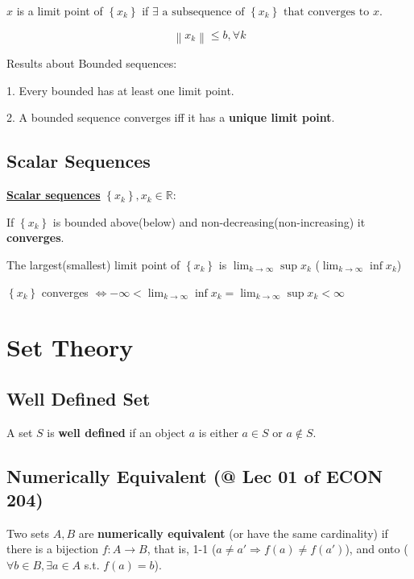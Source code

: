 \documentclass[11pt]{elegantbook}
\begin{document}
\begin{definition}
$x$ is a limit point of $\left\{x_{k}\right\}$ if $\exists \text { a subsequence of }\left\{x_{k}\right\} \text { that converges to } x$.
\end{definition}

\begin{definition}
    $$\left\|x_{k}\right\| \leqslant b, \forall k$$
\end{definition}

Results about Bounded sequences:

1. Every bounded has at least one limit point.

2. A bounded sequence converges iff it has a \textbf{unique limit point}.

\subsection{Scalar Sequences}
\textbf{\underline{Scalar sequences}} $\left\{x_{k}\right\}, x_{k} \in \mathbb{R}$:
\begin{proposition}
    If $\left\{x_{k}\right\}$ is bounded above(below) and non-decreasing(non-increasing) it \textbf{converges}.
\end{proposition}

\begin{proposition}
    The largest(smallest) limit point of $\left\{x_{k}\right\}$ is $\lim _{k \rightarrow \infty}\sup x_{k}$ ($\lim _{k \rightarrow \infty}\inf x_{k}$)
\end{proposition}

\begin{proposition}
    $\left\{x_{k}\right\}$ converges $\Longleftrightarrow-\infty<\lim _{k \rightarrow \infty} \inf x_{k}=\lim _{k \rightarrow \infty}\sup x_{k}<\infty$
\end{proposition}

\section{Set Theory}
\subsection{Well Defined Set}
\begin{definition}
    A set $S$ is \textbf{well defined} if an object $a$ is either $a\in S$ or $a\notin S$.
\end{definition}

\subsection{Numerically Equivalent \small{(@ Lec 01 of ECON 204)}}
\begin{definition}
\normalfont
    Two sets $A, B$ are \textbf{numerically equivalent} (or have the same cardinality) if there is a bijection $f : A \rightarrow B$, that is, 1-1 ($a \neq a' \Rightarrow f(a) \neq f(a')$), and onto ($\forall b\in B, \exists a\in A$ s.t. $f(a)=b$).
\end{definition}
\end{document}
